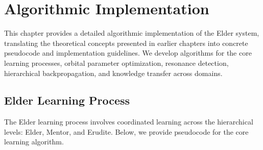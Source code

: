 \chapter{Algorithmic Implementation}

This chapter provides a detailed algorithmic implementation of the Elder system, translating the theoretical concepts presented in earlier chapters into concrete pseudocode and implementation guidelines. We develop algorithms for the core learning processes, orbital parameter optimization, resonance detection, hierarchical backpropagation, and knowledge transfer across domains.

\section{Elder Learning Process}



The Elder learning process involves coordinated learning across the hierarchical levels: Elder, Mentor, and Erudite. Below, we provide pseudocode for the core learning algorithm.

